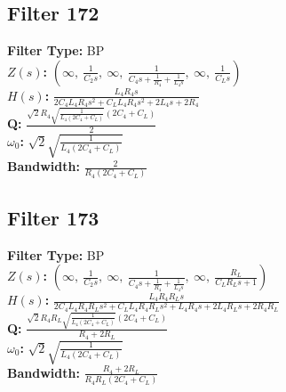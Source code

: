 \documentclass{article}
\begin{document}
\subsection*{Filter 172}
\textbf{Filter Type:} BP \\ 
\textbf{$Z(s)$:} $\left( \infty, \  \frac{1}{C_{2} s}, \  \infty, \  \frac{1}{C_{4} s + \frac{1}{R_{4}} + \frac{1}{L_{4} s}}, \  \infty, \  \frac{1}{C_{L} s}\right)$ \\ 
\textbf{$H(s)$:} $\frac{L_{4} R_{4} s}{2 C_{4} L_{4} R_{4} s^{2} + C_{L} L_{4} R_{4} s^{2} + 2 L_{4} s + 2 R_{4}}$ \\ 
\textbf{Q:} $\frac{\sqrt{2} R_{4} \sqrt{\frac{1}{L_{4} \left(2 C_{4} + C_{L}\right)}} \left(2 C_{4} + C_{L}\right)}{2}$ \\ 
\textbf{$\omega_0$:} $\sqrt{2} \sqrt{\frac{1}{L_{4} \left(2 C_{4} + C_{L}\right)}}$ \\ 
\textbf{Bandwidth:} $\frac{2}{R_{4} \left(2 C_{4} + C_{L}\right)}$ \\ 
\subsection*{Filter 173}
\textbf{Filter Type:} BP \\ 
\textbf{$Z(s)$:} $\left( \infty, \  \frac{1}{C_{2} s}, \  \infty, \  \frac{1}{C_{4} s + \frac{1}{R_{4}} + \frac{1}{L_{4} s}}, \  \infty, \  \frac{R_{L}}{C_{L} R_{L} s + 1}\right)$ \\ 
\textbf{$H(s)$:} $\frac{L_{4} R_{4} R_{L} s}{2 C_{4} L_{4} R_{4} R_{L} s^{2} + C_{L} L_{4} R_{4} R_{L} s^{2} + L_{4} R_{4} s + 2 L_{4} R_{L} s + 2 R_{4} R_{L}}$ \\ 
\textbf{Q:} $\frac{\sqrt{2} R_{4} R_{L} \sqrt{\frac{1}{L_{4} \left(2 C_{4} + C_{L}\right)}} \left(2 C_{4} + C_{L}\right)}{R_{4} + 2 R_{L}}$ \\ 
\textbf{$\omega_0$:} $\sqrt{2} \sqrt{\frac{1}{L_{4} \left(2 C_{4} + C_{L}\right)}}$ \\ 
\textbf{Bandwidth:} $\frac{R_{4} + 2 R_{L}}{R_{4} R_{L} \left(2 C_{4} + C_{L}\right)}$ \\ 
\end{document}
